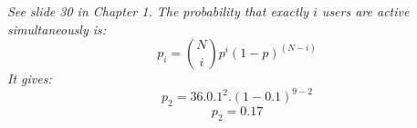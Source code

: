 \documentclass{llncs}
\newcounter{ques}
\newcommand{\answer}[1]{\color{red}\textit{#1}\color{black}}
\begin{document}
\answer{See slide 30 in Chapter 1.
  The probability that exactly $i$ users are active simultaneously is:
  \begin{equation*}
    p_i = \binom{N}{i} p^i(1-p)^{(N-i)}
  \end{equation*}
  It gives:
  \begin{equation*}
    p_2 = 36.0.1^2.(1-0.1)^{9-2}
  \end{equation*}
  \begin{equation*}
    p_2 = 0.17
  \end{equation*}
}

\newpage









\end{document}
